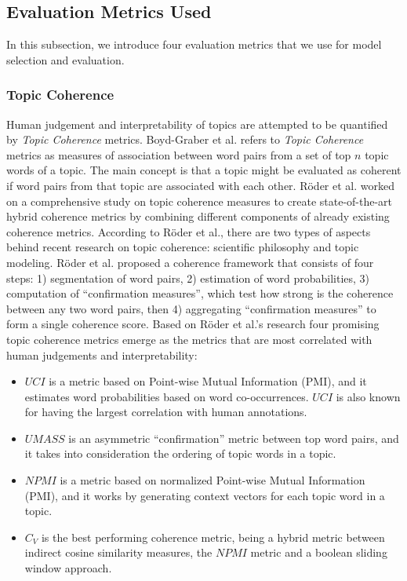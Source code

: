    \subsection{Evaluation Metrics Used \label{background:metrics}}
    
        In this subsection, we introduce four evaluation metrics that we use for model selection and evaluation.
        
        \subsubsection{Topic Coherence\label{background:T_coherence}}
            Human judgement and interpretability of topics are attempted to be quantified by \emph{Topic Coherence} metrics. Boyd-Graber et al. \cite{boyd2014care} refers to \emph{Topic Coherence} metrics as measures of association between word pairs from a set of top $n$ topic words of a topic. The main concept is that a topic might be evaluated as coherent if word pairs from that topic are associated with each other. R{\"o}der et al. \cite{roder2015exploring} worked on a comprehensive study on topic coherence measures to create state-of-the-art hybrid coherence metrics by combining different components of already existing coherence metrics. According to R{\"o}der et al., there are two types of aspects behind recent research on topic coherence: scientific philosophy and topic modeling. R{\"o}der et al. proposed a coherence framework that consists of four steps: 1) segmentation of word pairs, 2) estimation of word probabilities, 3) computation of ``confirmation measures'', which test how strong is the coherence between any two word pairs, then 4) aggregating ``confirmation measures'' to form a single coherence score. Based on R{\"o}der et al.'s research four promising topic coherence metrics emerge as the metrics that are most correlated with human judgements and interpretability:
                \begin{itemize}
                    \item $UCI$ is a metric based on Point-wise Mutual Information (PMI), and it estimates word probabilities based on word co-occurrences. $UCI$ is also known for having the largest correlation with human annotations.
                    \item $UMASS$ is an asymmetric ``confirmation'' metric between top word pairs, and it takes into consideration the ordering of topic words in a topic.
                    \item $NPMI$ is a metric based on normalized Point-wise Mutual Information (PMI), and it works by generating context vectors for each topic word in a topic.
                    \item $C_V$ is the best performing coherence metric, being a hybrid metric between indirect cosine similarity measures, the $NPMI$ metric and a boolean sliding window approach.
                \end{itemize}
                
